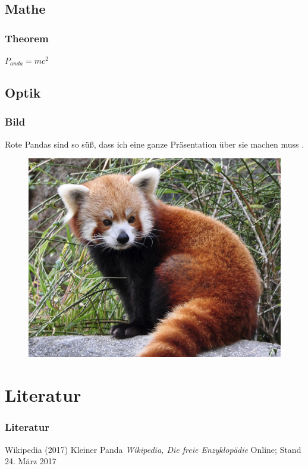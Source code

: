 \documentclass{beamer}
\begin{document}
\subsection{Mathe}

\begin{frame}
\frametitle{Theorem}
\begin{theorem}
$P_{anda}=mc^2$
\end{theorem}
\end{frame}

\subsection{Optik}

\begin{frame}
\frametitle{Bild}
Rote Pandas sind so süß, dass ich eine ganze Präsentation über sie machen muss \cite{p1}. \pause
\begin{figure}
\includegraphics[width=0.7\linewidth]{panda.jpg}
\end{figure}
\end{frame}

\section{Literatur}
\begin{frame}
\frametitle{Literatur}
\footnotesize{
\begin{thebibliography}{99}
 Wikipedia (2017)
\newblock Kleiner Panda
\newblock \emph{Wikipedia{,} Die freie Enzyklopädie}
\newblock Online; Stand 24. März 2017
\end{thebibliography}
}
\end{frame}
\end{document}
